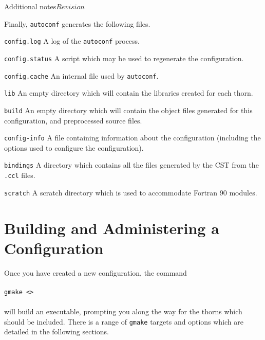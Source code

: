 \begin{cactuspart}{Additional notes}{}{$Revision$}
\begin{Lentry}
\begin{Lentry}
\end{Lentry}

Finally, \texttt{autoconf} generates the following files.

\begin{Lentry}

\item [\texttt{config.log}]
A log of the \texttt{autoconf} process.

\item [\texttt{config.status}]
A script which may be used to regenerate the configuration.

\item [\texttt{config.cache}]
An internal file used by \texttt{autoconf}.

\end{Lentry}

\item [\texttt{lib}]
An empty directory which will contain the libraries created for each thorn.

\item [\texttt{build}]
An empty directory which will contain the object files generated for this
configuration, and preprocessed source files.

\item [\texttt{config-info}]
A file containing information about the configuration (including the options used to configure the configuration).

\item [\texttt{bindings}] A directory which contains all the files
generated by the CST from the \texttt{.ccl} files.

\item [\texttt{scratch}]
A scratch directory which is used to accommodate Fortran 90 modules.

\end{Lentry}


\section{Building and Administering a Configuration}
\label{sec:buanadaco}

Once you have created a new configuration, the command
\\ \\
\texttt{gmake <>}
\\ \\
will build an executable, prompting you along the way for the
thorns which should be included. There is a range of \texttt{gmake}
targets and options which are detailed in the following sections.


\end{cactuspart}
